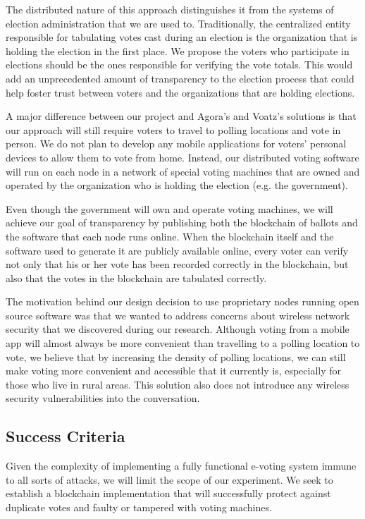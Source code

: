 \documentclass[conference]{IEEEtran}
\begin{document}
The distributed nature of this approach distinguishes it from the systems of election administration that we are used to. Traditionally, the centralized entity responsible for tabulating votes cast during an election is the organization that is holding the election in the first place. We propose the voters who participate in elections should be the ones responsible for verifying the vote totals. This would add an unprecedented amount of transparency to the election process that could help foster trust between voters and the organizations that are holding elections.

A major difference between our project and Agora's and Voatz's solutions is that our approach will still require voters to travel to polling locations and vote in person. We do not plan to develop any mobile applications for voters' personal devices to allow them to vote from home. Instead, our distributed voting software will run on each node in a network of special voting machines that are owned and operated by the organization who is holding the election (e.g. the government).

Even though the government will own and operate voting machines, we will achieve our goal of transparency by publishing both the blockchain of ballots and the software that each node runs online. When the blockchain itself and the software used to generate it are publicly available online, every voter can verify not only that his or her vote has been recorded correctly in the blockchain, but also that the votes in the blockchain are tabulated correctly.

The motivation behind our design decision to use proprietary nodes running open source software was that we wanted to address concerns about wireless network security that we discovered during our research. Although voting from a mobile app will almost always be more convenient than travelling to a polling location to vote, we believe that by increasing the density of polling locations, we can still make voting more convenient and accessible that it currently is, especially for those who live in rural areas. This solution also does not introduce any wireless security vulnerabilities into the conversation.

\subsection{Success Criteria}
Given the complexity of implementing a fully functional e-voting system immune to all sorts of attacks, we will limit the scope of our experiment. We seek to establish a blockchain implementation that will successfully protect against duplicate votes and faulty or tampered with voting machines.
\end{document}
